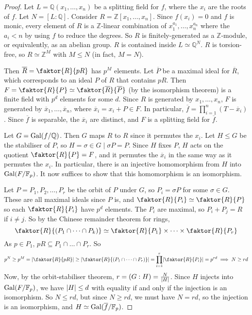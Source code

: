 \begin{proof}
	Let \( L = \mathbb Q(x_1, \dots, x_n) \) be a splitting field for \( f \), where the \( x_i \) are the roots of \( f \).
	Let \( N = [L:\mathbb Q] \).
	Consider \( R = \mathbb Z[x_1, \dots, x_n] \).
	Since \( f(x_i) = 0 \) and \( f \) is monic, every element of \( R \) is a \( \mathbb Z \)-linear combination of \( x_1^{a_1}, \dots, x_n^{a_n} \) where the \( a_i < n \) by using \( f \) to reduce the degrees.
	So \( R \) is finitely-generated as a \( \mathbb Z \)-module, or equivalently, as an abelian group.
	\( R \) is contained inside \( L \simeq \mathbb Q^N \).
	\( R \) is torsion-free, so \( R \simeq \mathbb Z^M \) with \( M \leq N \) (in fact, \( M = N \)).

	Then \( \overline R = \faktor{R}{pR} \) has \( p^M \) elements.
	Let \( \overline P \) be a maximal ideal for \( \overline R \), which corresponds to an ideal \( P \) of \( R \) that contains \( pR \).
	Then \( F = \faktor{R}{P} \simeq \faktor{\overline R}{\overline P} \) (by the isomorphism theorem) is a finite field with \( p^d \) elements for some \( d \).
	Since \( R \) is generated by \( x_1, \dots, x_n \), \( F \) is generated by \( \overline x_1, \dots, \overline x_n \), where \( \overline x_i = x_i + P \in F \).
	In particular, \( \overline f = \prod_{i=1}^n (T - \overline x_i) \).
	Since \( \overline f \) is separable, the \( \overline x_i \) are distinct, and \( F \) is a splitting field for \( \overline f \).

	Let \( G = \operatorname{Gal}(f/\mathbb Q) \).
	Then \( G \) maps \( R \) to \( R \) since it permutes the \( x_i \).
	Let \( H \leq G \) be the stabiliser of \( P \), so \( H = {\sigma \in G \mid \sigma P = P} \).
	Since \( H \) fixes \( P \), \( H \) acts on the quotient \( \faktor{R}{P} = F \), and it permutes the \( \overline x_i \) in the same way as it permutes the \( x_i \).
	In particular, there is an injective homomorphism from \( H \) into \( \operatorname{Gal}(F/\mathbb F_p) \).
	It now suffices to show that this homomorphism is an isomorphism.

	Let \( {P = P_1, P_2, \dots, P_r} \) be the orbit of \( P \) under \( G \), so \( P_i = \sigma P \) for some \( \sigma \in G \).
	These are all maximal ideals since \( P \) is, and \( \faktor{R}{P_i} \simeq \faktor{R}{P} \) so each \( \faktor{R}{P_i} \) have \( p^d \) elements.
	The \( P_i \) are maximal, so \( P_i + P_j = R \) if \( i \neq j \).
	So by the Chinese remainder theorem for rings,
	\[ \faktor{R}{(P_1 \cap \dots \cap P_k)} \simeq \faktor{R}{P_1} \times \dots \times \faktor{R}{P_r} \]
	As \( p \in P_1 \), \( pR \subseteq P_1 \cap \dots \cap P_r \).
	So
	\[ p^N \geq p^M = \abs{\faktor{R}{pR}} \geq \abs{\faktor{R}{(P_1 \cap \dots \cap P_r)}} = \prod_{i=1}^r \abs{\faktor{R}{P_i}} = p^{rd} \implies N \geq rd \]
	Now, by the orbit-stabiliser theorem, \( r = (G : H) = \frac{N}{\lvert H\rvert} \).
	Since \( H \) injects into \( \operatorname{Gal}(F/\mathbb F_p) \), we have \( \lvert H\rvert \leq d \) with equality if and only if the injection is an isomorphism.
	So \( N \leq rd \), but since \( N \geq rd \), we must have \( N = rd \), so the injection is an isomorphism, and \( H \simeq \operatorname{Gal}(\overline f/\mathbb F_p) \).
\end{proof}

